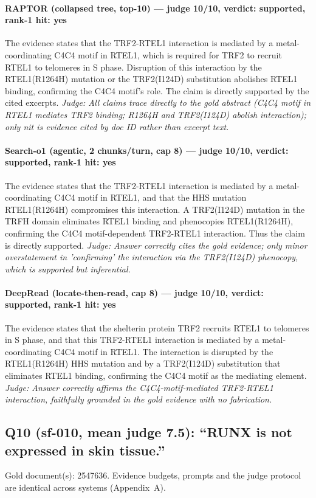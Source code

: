\documentclass[sigconf, review, anonymous]{acmart}
\begin{document}
\paragraph{RAPTOR (collapsed tree, top-10) --- judge 10/10, verdict: supported, rank-1 hit: yes}
\noindent The evidence states that the TRF2-RTEL1 interaction is mediated by a metal-coordinating C4C4 motif in RTEL1, which is required for TRF2 to recruit RTEL1 to telomeres in S phase. Disruption of this interaction by the RTEL1(R1264H) mutation or the TRF2(I124D) substitution abolishes RTEL1 binding, confirming the C4C4 motif's role. The claim is directly supported by the cited excerpts.
\noindent\small\textit{Judge: All claims trace directly to the gold abstract (C4C4 motif in RTEL1 mediates TRF2 binding; R1264H and TRF2(I124D) abolish interaction); only nit is evidence cited by doc ID rather than excerpt text.}
\paragraph{Search-o1 (agentic, 2 chunks/turn, cap 8) --- judge 10/10, verdict: supported, rank-1 hit: yes}
\noindent The evidence states that the TRF2-RTEL1 interaction is mediated by a metal-coordinating C4C4 motif in RTEL1, and that the HHS mutation RTEL1(R1264H) compromises this interaction. A TRF2(I124D) mutation in the TRFH domain eliminates RTEL1 binding and phenocopies RTEL1(R1264H), confirming the C4C4 motif-dependent TRF2-RTEL1 interaction. Thus the claim is directly supported.
\noindent\small\textit{Judge: Answer correctly cites the gold evidence; only minor overstatement in 'confirming' the interaction via the TRF2(I124D) phenocopy, which is supported but inferential.}
\paragraph{DeepRead (locate-then-read, cap 8) --- judge 10/10, verdict: supported, rank-1 hit: yes}
\noindent The evidence states that the shelterin protein TRF2 recruits RTEL1 to telomeres in S phase, and that this TRF2-RTEL1 interaction is mediated by a metal-coordinating C4C4 motif in RTEL1. The interaction is disrupted by the RTEL1(R1264H) HHS mutation and by a TRF2(I124D) substitution that eliminates RTEL1 binding, confirming the C4C4 motif as the mediating element.
\noindent\small\textit{Judge: Answer correctly affirms the C4C4-motif-mediated TRF2-RTEL1 interaction, faithfully grounded in the gold evidence with no fabrication.}

\subsection{Q10 (sf-010, mean judge 7.5): ``RUNX is not expressed in skin tissue.''}
\label{app:q10}
\noindent Gold document(s): 2547636. Evidence budgets, prompts and the judge protocol are identical across systems (Appendix~A).
\end{document}
